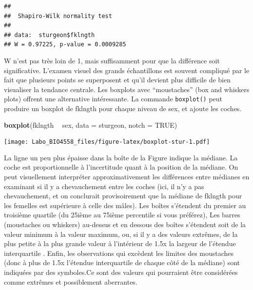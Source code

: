 \documentclass[12pt,]{book}
\newenvironment{Shaded}{\begin{snugshade}}{\end{snugshade}}
\newcommand{\DataTypeTok}[1]{\textcolor[rgb]{0.13,0.29,0.53}{#1}}
\newcommand{\KeywordTok}[1]{\textcolor[rgb]{0.13,0.29,0.53}{\textbf{#1}}}
\newcommand{\NormalTok}[1]{#1}
\newcommand{\OperatorTok}[1]{\textcolor[rgb]{0.81,0.36,0.00}{\textbf{#1}}}
\newcommand{\OtherTok}[1]{\textcolor[rgb]{0.56,0.35,0.01}{#1}}
\newcommand{\StringTok}[1]{\textcolor[rgb]{0.31,0.60,0.02}{#1}}
\begin{document}
\begin{Shaded}
\end{Shaded}

\begin{verbatim}
## 
##  Shapiro-Wilk normality test
## 
## data:  sturgeon$fklngth
## W = 0.97225, p-value = 0.0009285
\end{verbatim}

W n'est pas très loin de 1, mais suffisamment pour que la différence soit significative.
L'examen visuel des grands échantillons est souvent compliqué par le fait que plusieurs points se superposent et qu'il devient plus difficile de bien visualiser la tendance centrale.
Les boxplots avec ``moustaches'' (box and whiskers plots) offrent une alternative intéressante.
La commande \texttt{boxplot()} peut produire un boxplot de fklngth pour chaque niveau de sex, et ajoute les coches.

\begin{Shaded}
\begin{Highlighting}[]
\KeywordTok{boxplot}\NormalTok{(fklngth }\OperatorTok{~}\StringTok{ }\NormalTok{sex, }\DataTypeTok{data =}\NormalTok{ sturgeon, }\DataTypeTok{notch =} \OtherTok{TRUE}\NormalTok{)}
\end{Highlighting}
\end{Shaded}

\texttt{[image: Labo\_BIO4558\_files/figure-latex/boxplot-stur-1.pdf]}

La ligne un peu plus épaisse dans la boîte de la Figure indique la médiane.
La coche est proportionnelle à l'incertitude quant à la position de la médiane.
On peut visuellement interpréter approximativement les différences entre médianes en examinant si il y a chevauchement entre les coches (ici, il n'y a pas chevauchement, et on conclurait provisoirement que la médiane de fklngth pour les femelles est supérieure à celle des mâles).
Les boîtes s'étendent du premier au troisième quartile (du 25ième au 75ième percentile si vous préférez), Les barres (moustaches ou whiskers) au-dessus et en dessous des boîtes s'étendent soit de la valeur minimum à la valeur maximum, ou, si il y a des valeurs extrêmes, de la plus petite à la plus grande valeur à l'intérieur de 1.5x la largeur de l'étendue interquartile .
Enfin, les observations qui excèdent les limites des moustaches (donc à plus de 1.5x l'étendue interquartile de chaque côté de la médiane) sont indiquées par des symboles.Ce sont des valeurs qui pourraient être considérées comme extrêmes et possiblement aberrantes.
\end{document}
